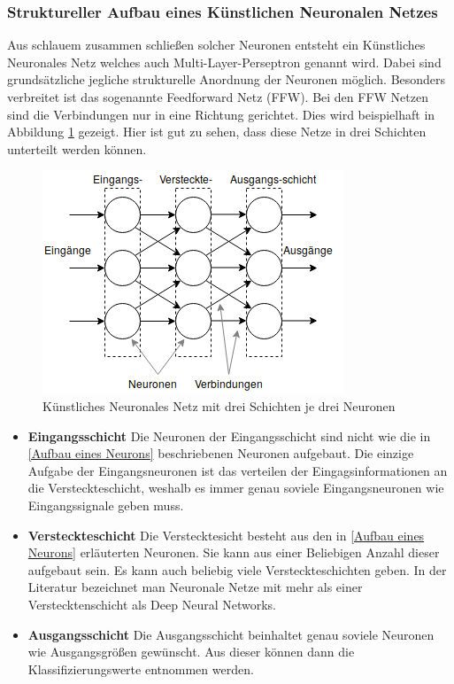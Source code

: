 \subsubsection{Struktureller Aufbau eines Künstlichen Neuronalen Netzes}
Aus schlauem zusammen schließen solcher Neuronen entsteht ein Künstliches Neuronales Netz welches auch Multi-Layer-Perseptron genannt wird. Dabei sind grundsätzliche jegliche strukturelle Anordnung der Neuronen möglich. Besonders verbreitet ist das sogenannte Feedforward Netz (FFW).
Bei den FFW Netzen sind die Verbindungen nur in eine Richtung gerichtet. Dies wird beispielhaft in Abbildung \ref{fig:neural_network} gezeigt. Hier ist gut zu sehen, dass diese Netze in drei Schichten unterteilt werden können.  

\begin{figure}[htb]
  \centering  
  \includegraphics[scale=0.9]{img/mlp.png}
  \caption{Künstliches Neuronales Netz mit drei Schichten je drei Neuronen}
  \label{fig:neural_network}
\end{figure}


\begin{itemize}
\item \textbf{Eingangsschicht} Die Neuronen der Eingangsschicht sind nicht wie die in \ref{Aufbau eines Neurons} beschriebenen Neuronen aufgebaut. Die einzige Aufgabe der Eingangsneuronen ist das verteilen der Eingagsinformationen an die Versteckteschicht, weshalb es immer genau soviele Eingangsneuronen wie Eingangssignale geben muss.

\item \textbf{Versteckteschicht}
Die Verstecktesicht besteht aus den in \ref{Aufbau eines Neurons} erläuterten Neuronen. Sie kann aus einer Beliebigen Anzahl dieser aufgebaut sein. Es kann auch beliebig viele Versteckteschichten geben. In der Literatur bezeichnet man Neuronale Netze mit mehr als einer Verstecktenschicht als Deep Neural Networks.

\item \textbf{Ausgangsschicht}
Die Ausgangsschicht beinhaltet genau soviele Neuronen wie Ausgangsgrößen gewünscht.
Aus dieser können dann die Klassifizierungswerte entnommen werden.
\end{itemize}


